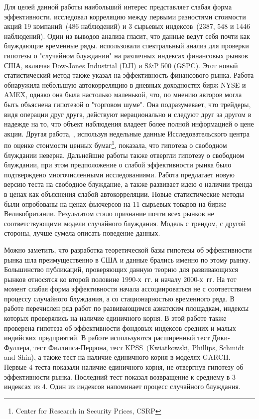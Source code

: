 \documentclass[a4paper,12pt]{article}
\begin{document}
Для целей данной работы наибольший интерес представляет слабая форма эффективности. \cite{Kendall1953} исследовал корреляцию между первыми разностями стоимости акций 19 компаний~(486 наблюдений) и 3 сырьевых индексов~(2387, 548 и 1446 наблюдений). Один из выводов анализа гласит, что данные ведут себя почти как блуждающие временные ряды. \cite{Granger1963} использовали спектральный анализ для проверки гипотезы о "случайном блуждании" на различных индексах финансовых рынков США, включая Dow-Jones Industrial (DJI) и S$\&$P 500 (GSPC). Этот новый статистический метод также указал на эффективность финансового рынка. Работа \cite{French1986} обнаружила небольшую автокорреляцию в дневных доходностях бирж NYSE и AMEX, однако она была настолько маленькой, что, по мнению авторов могла быть объяснена гипотезой о "торговом шуме". Она подразумевает, что трейдеры, видя операции друг друга, действуют нерационально и следуют друг за другом в надежде на то, что объект наблюдения владеет более полной информацией о цене акции. Другая работа, \cite{Lo1987}, используя недельные данные Исследовательского центра по оценке стоимости ценных бумаг\footnote{Center for Research in Security Prices, CSRP}, показала, что гипотеза о свободном блуждании неверна. Дальнейшие работы также отвергли гипотезу о свободном блуждании, при этом предположение о слабой эффективности рынка было подтверждено многочисленными исследованиями. Работа \cite{Taylor1982} предлагает новую версию теста на свободное блуждание, а также развивает идею о наличии тренда в ценах как объяснения слабой автокорреляции. Новые статистические методы были опробованы на ценах фьючерсов на 11 сырьевых товаров на бирже Великобритании. Результатом стало признание почти всех рынков не соответствующими модели случайного блуждания. Модель с трендом, с другой стороны, лучше сумела описать поведение данных.

Можно заметить, что разработка теоретической базы гипотезы об эффективности рынка шла преимущественно в США и данные брались именно по этому рынку. Большинство публикаций, проверяющих данную теорию для развивающихся рынков относятся ко второй половине 1990-х~гг. и началу 2000-х~гг. На тот момент слабая форма эффективности начала ассоциироваться не с соответствием процессу случайного блуждания, а со стационарностью временного ряда. В работе \cite{Mishra2017} перечислен ряд работ по развивающимся азиатским площадкам, индексы которых проверялись на наличие единичного корня. В этой работе также проверена гипотеза об эффективности фондовых индексов средних и малых индийских предприятий. В работе используются расширенный тест Дики-Фуллера, тест Филлипса-Перрона, тест KPSS~(Kwiatkowski, Phillips, Schmidt and Shin), а также тест на наличие единичного корня в моделях GARCH. Первые 4 теста показали наличие единичного корня, не отвергнув гипотезу об эффективности рынка. Последний тест показал возвращение к среднему в 3 индексах из 4. Один из индексов напоминает процесс случайного блуждания.
\end{document}
